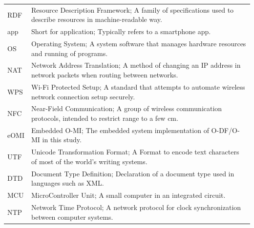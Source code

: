 \begin{longtable}{@{}p{}p{}@{}}
RDF & Resource Description Framework; A family of specifications used to describe resources in machine-readable way. \\
app & Short for application; Typically refers to a smartphone app. \\
OS & Operating System; A system software that manages hardware resources and running of programs. \\
NAT & Network Address Translation; A method of changing an IP address in network packets when routing between networks. \\%
WPS & Wi-Fi Protected Setup; A standard that attempts to automate wireless network connection setup securely. \\
NFC & Near-Field Communication; A group of wireless communication protocols, intended to restrict range to a few cm. \\
eOMI & Embedded O-MI; The embedded system implementation of O-DF/O-MI in this study. \\
UTF & Unicode Transformation Format; A Format to encode text characters of most of the world's writing systems. \\
DTD & Document Type Definition; Declaration of a document type used in languages such as XML. \\
MCU & MicroController Unit; A small computer in an integrated circuit. \\
NTP & Network Time Protocol; A network protocol for clock synchronization between computer systems. \\


\end{longtable}
